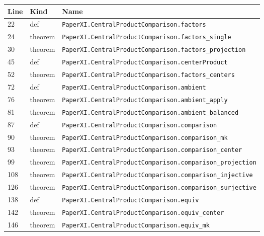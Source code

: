 \documentclass[10pt,oneside]{book}
\begin{document}
\begin{longtable}{@{}p{}p{}p{}@{}}\toprule Line&Kind&Name\\\midrule\endhead

22&def&\nolinkurl{PaperXI.CentralProductComparison.factors}\\

24&theorem&\nolinkurl{PaperXI.CentralProductComparison.factors_single}\\

30&theorem&\nolinkurl{PaperXI.CentralProductComparison.factors_projection}\\

45&def&\nolinkurl{PaperXI.CentralProductComparison.centerProduct}\\

52&theorem&\nolinkurl{PaperXI.CentralProductComparison.factors_centers}\\

72&def&\nolinkurl{PaperXI.CentralProductComparison.ambient}\\

76&theorem&\nolinkurl{PaperXI.CentralProductComparison.ambient_apply}\\

81&theorem&\nolinkurl{PaperXI.CentralProductComparison.ambient_balanced}\\

87&def&\nolinkurl{PaperXI.CentralProductComparison.comparison}\\

90&theorem&\nolinkurl{PaperXI.CentralProductComparison.comparison_mk}\\

93&theorem&\nolinkurl{PaperXI.CentralProductComparison.comparison_center}\\

99&theorem&\nolinkurl{PaperXI.CentralProductComparison.comparison_projection}\\

108&theorem&\nolinkurl{PaperXI.CentralProductComparison.comparison_injective}\\

126&theorem&\nolinkurl{PaperXI.CentralProductComparison.comparison_surjective}\\

138&def&\nolinkurl{PaperXI.CentralProductComparison.equiv}\\

142&theorem&\nolinkurl{PaperXI.CentralProductComparison.equiv_center}\\

146&theorem&\nolinkurl{PaperXI.CentralProductComparison.equiv_mk}\\

\bottomrule\end{longtable}
\end{document}

